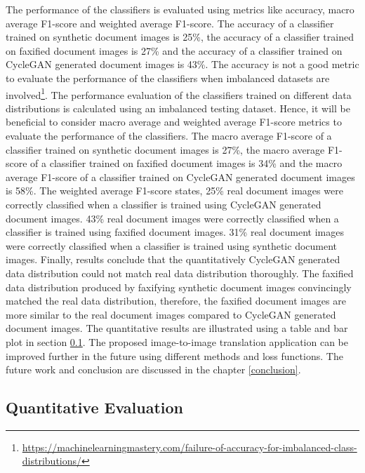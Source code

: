 The performance of the classifiers is evaluated using metrics like accuracy, macro average F1-score and weighted average F1-score. The accuracy of a classifier trained on synthetic document images is 25\%, the accuracy of a classifier trained on faxified document images is 27\% and the accuracy of a classifier trained on \ac{CycleGAN} generated document images is 43\%. The accuracy is not a good metric to evaluate the performance of the classifiers when imbalanced datasets are involved\footnote{\url{https://machinelearningmastery.com/failure-of-accuracy-for-imbalanced-class-distributions/} \dcdate}. The performance evaluation of the classifiers trained on different data distributions is calculated using an imbalanced testing dataset. Hence, it will be beneficial to consider macro average and weighted average F1-score metrics to evaluate the performance of the classifiers. The macro average F1-score of a classifier trained on synthetic document images is 27\%, the macro average F1-score of a classifier trained on faxified document images is 34\% and the macro average F1-score of a classifier trained on \ac{CycleGAN} generated document images is 58\%. The weighted average F1-score states, 25\% real document images were correctly classified when a classifier is trained using \ac{CycleGAN} generated document images. 43\% real document images were correctly classified when a classifier is trained using faxified document images. 31\% real document images were correctly classified when a classifier is trained using synthetic document images. Finally, results conclude that the quantitatively \ac{CycleGAN} generated data distribution could not match real data distribution thoroughly. The faxified data distribution produced by faxifying synthetic document images convincingly matched the real data distribution, therefore, the faxified document images are more similar to the real document images compared to \ac{CycleGAN} generated document images. The quantitative results are illustrated using a table and bar plot in section \ref{QuantitativeResults}. The proposed image-to-image translation application can be improved further in the future using different methods and loss functions. The future work and conclusion are discussed in the chapter \ref{conclusion}.


\subsection{Quantitative Evaluation}\label{QuantitativeResults}


